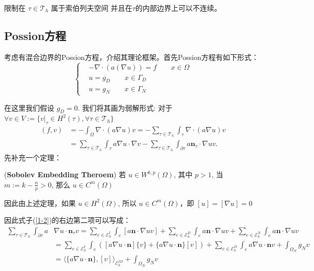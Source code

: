 限制在 $\tau \in \mathscr{T}_h$ 属于索伯列夫空间 并且在$\tau$的内部边界上可以不连续。

\subsection{Possion方程}
考虑有混合边界的Possion方程，介绍其理论框架。首先Possion方程有如下形式：
\begin{equation}\label{possion}
    \left\{\begin{aligned}
    &-\nabla\cdot(a(\nabla u))=f\qquad x \in \Omega\\
    &u=g_D \qquad x\in\Gamma_D\\
    &u=g_N \qquad x\in\Gamma_N
\end{aligned}\right.\end{equation}

在这里我们假设 $g_D=0$. 我们将其画为弱解形式: 对于 $\forall v\in V:=\{v|_\tau\in H^2(\tau),\forall \tau\in \mathscr{T}_h\}$
\begin{equation}\label{1-2}
    \begin{aligned}
    (f, v) & =-\int_{\Omega} \nabla \cdot(a \nabla u) v=-\sum_{\tau \in \mathscr{T}_{h}} \int_{\tau} \nabla \cdot(a \nabla u) v \\
    & =\sum_{\tau \in \mathscr{T}_{h}} \int_{\tau} a \nabla u \cdot \nabla v-\sum_{\tau \in \mathscr{T}_{h}} \int_{\partial \tau} a \textbf{n}_{\tau}\cdot \nabla u  v .
    \end{aligned}
\end{equation}
先补充一个定理：
\begin{theorem}(\textbf{Sobolev Embedding Theroem})
    若 $u\in W^{k,p}(\Omega)$, 其中 $p>1$, 当 $m:=k-\frac{n}{p}>0$, 那么 $u\in C^{m}(\Omega)$
\end{theorem}

因此由上述定理，如果 $u\in H^2(\Omega)$, 所以 $u\in C^m(\Omega)$，即 $[u]=[\nabla u]=0$

因此式子(\ref{1-2})的右边第二项可以写成：
$$\begin{aligned}
\sum_{\tau \in \mathscr{T}_{h}} \int_{\partial \tau} a & \nabla u \cdot \textbf{n}_{\tau} v=\sum_{e \in \mathcal{E}_{h}^{I}} \int_{e}[a \textbf{n}\cdot \nabla u  v] +\sum_{e \in \mathcal{E}_{h}^{D}} \int_{e} a\textbf{n}\cdot \nabla u  v + \sum_{e \in \mathcal{E}_{h}^{N}} \int_{e} a \textbf{n}\cdot \nabla u  v \\
& =\sum_{e \in \mathcal{E}_{h}^{I}} \int_{e}([a \nabla u \cdot \textbf{n}]\{v\}+\{a \nabla u \cdot \textbf{n}\}[v])+\sum_{e \in \mathcal{E}_{h}^{D}} \int_{e} a \nabla u \cdot \textbf{n} v +\int_{\Omega_N}g_Nv\\
& =\langle\{a \nabla u \cdot \textbf{n}\},[v]\rangle_{\mathcal{E}_{h}^{I D}}+\int_{\Omega_N}g_Nv
\end{aligned}$$

